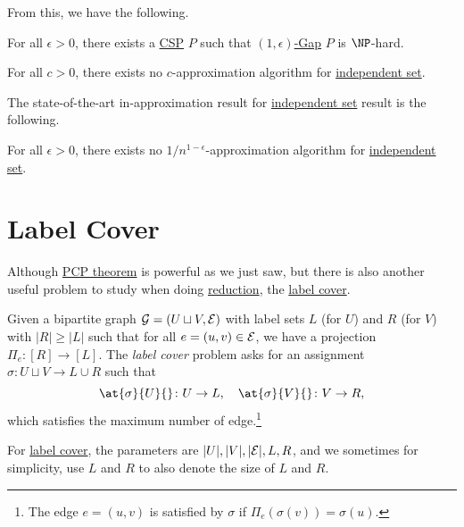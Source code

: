 From this, we have the following.

\begin{theorem}
	For all \(\epsilon > 0\), there exists a \hyperref[prb:CSP]{CSP} \(P\) such that \hyperref[def:c-s-Gap]{\((1, \epsilon )\)-Gap} \(P\) is \(\NP\)-hard.
\end{theorem}
\begin{corollary}
	For all \(c > 0\), there exists no \(c\)-approximation algorithm for \hyperref[prb:independent-set]{independent set}.
\end{corollary}

The state-of-the-art in-approximation result for \hyperref[prb:independent-set]{independent set} result is the following.

\begin{theorem}
	For all \(\epsilon > 0\), there exists no \(1 / n^{1-\epsilon }\)-approximation algorithm for \hyperref[prb:independent-set]{independent set}.
\end{theorem}

\section{Label Cover}
Although \hyperref[thm:PCP]{PCP theorem} is powerful as we just saw, but there is also another useful problem to study when doing \hyperref[def:reduction]{reduction}, the \hyperref[prb:label-cover]{label cover}.

\begin{problem}\label{prb:label-cover}
Given a bipartite graph \(\mathcal{\MakeUppercase{g}} =(U\sqcup V , \mathcal{\MakeUppercase{e}} )\) with label sets \(L\) (for \(U\)) and \(R\) (for \(V \)) with \(\vert R \vert \geq \vert L \vert \) such that for all \(e=(u, v)\in \mathcal{\MakeUppercase{e}} \), we have a projection \(\Pi _e \colon [R]\to [L]\). The \emph{label cover} problem asks for an assignment \(\sigma\colon U \sqcup V \to L \cup R\) such that
\[
	\at{\sigma }{U}{} \colon U \to L,\quad \at{\sigma }{V}{} \colon V \to R,
\]
which satisfies the maximum number of edge.\footnote{The edge \(e=(u, v)\) is satisfied by \(\sigma \) if \(\Pi _e(\sigma (v)) = \sigma (u)\).}
\end{problem}

\begin{center}
\end{center}

For \hyperref[prb:label-cover]{label cover}, the parameters are \(\vert U \vert, \vert V \vert , \vert \mathcal{\MakeUppercase{e}}  \vert , L, R\), and we sometimes for simplicity, use \(L\) and \(R\) to also denote the size of \(L\) and \(R\).

